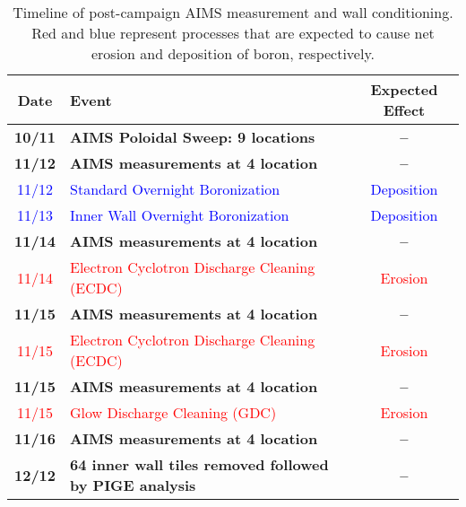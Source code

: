 \documentclass[11pt,a4paper,twocolumn]{article}
\begin{document}
%
\begin{table}
 \centering
 \begin{tabular}{|c|l|c|}
  \hline
  Date & Event & Expected Effect\\ \hline \hline 
  \textbf{10/11} & \textbf{AIMS Poloidal Sweep: 9 locations} & \textbf{--}\\ \hline
  \textbf{11/12} & \textbf{AIMS measurements at 4 location} & \textbf{--}\\ \hline
  \textcolor{blue}{11/12} & \textcolor{blue}{Standard Overnight Boronization} & \textcolor{blue}{Deposition} \\ \hline
  \textcolor{blue}{11/13} & \textcolor{blue}{Inner Wall Overnight Boronization} & \textcolor{blue}{Deposition} \\ \hline
  \textbf{11/14} & \textbf{AIMS measurements at 4 location} & \textbf{--}\\ \hline
  \textcolor{red}{11/14} & \textcolor{red}{Electron Cyclotron Discharge Cleaning (ECDC)} & \textcolor{red}{Erosion} \\ \hline
  \textbf{11/15} & \textbf{AIMS measurements at 4 location} & \textbf{--}\\ \hline
  \textcolor{red}{11/15} & \textcolor{red}{Electron Cyclotron Discharge Cleaning (ECDC)} & \textcolor{red}{Erosion} \\ \hline
  \textbf{11/15} & \textbf{AIMS measurements at 4 location} & \textbf{--}\\ \hline
  \textcolor{red}{11/15} & \textcolor{red}{Glow Discharge Cleaning (GDC)} & \textcolor{red}{Erosion} \\ \hline
  \textbf{11/16} & \textbf{AIMS measurements at 4 location} & \textbf{--}\\ \hline
  \textbf{12/12} & \textbf{64 inner wall tiles removed followed by PIGE analysis} & \textbf{--}\\ \hline
 \end{tabular}
 \caption{Timeline of post-campaign AIMS measurement and wall conditioning. Red and blue represent processes that are expected to cause net erosion and deposition of boron, respectively.}
 \label{tab:PostCampaignTimeline}
\end{table}

\end{document}
